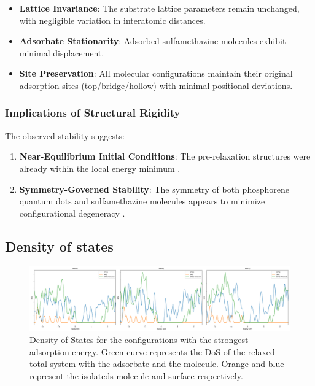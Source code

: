 \documentclass[preprint,12pt]{elsarticle}
\begin{document}
	\begin{itemize}
		\item \textbf{Lattice Invariance}: The substrate lattice parameters remain unchanged, with negligible variation in interatomic distances.
		
		\item \textbf{Adsorbate Stationarity}: Adsorbed sulfamethazine molecules exhibit minimal displacement.
		
		\item \textbf{Site Preservation}: All molecular configurations maintain their original adsorption sites (top/bridge/hollow) with minimal positional deviations.
	\end{itemize}
	
	\subsubsection{Implications of Structural Rigidity}
	The observed stability suggests:
	
	\begin{enumerate}
		\item \textbf{Near-Equilibrium Initial Conditions}: The pre-relaxation structures were already within the local energy minimum \cite{Alamatian2013Displacement-based}.
		
		\item \textbf{Symmetry-Governed Stability}: The symmetry of both phosphorene quantum dots and sulfamethazine molecules appears to minimize configurational degeneracy \cite{Yang2014Reversible}.
	\end{enumerate}
	
	
	
	\subsection{Density of states}
	
	\begin{center}
		\begin{figure}[H]		
			\label{f:DosMax}
			\includegraphics[width=1\textwidth]{Multiple-DoS-QD.png}
			
			\caption{Density of States for the configurations with the strongest adsorption energy. Green curve represents the DoS of the relaxed total system with the adsorbate and the molecule. Orange and blue represent the isolateds molecule and surface respectively.}
			\label{f:Dos_Max_ads}
		\end{figure}
		
	\end{center}
	
\end{document}
